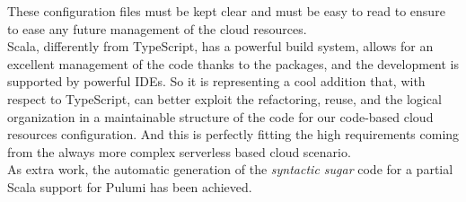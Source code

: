 These configuration files must be kept clear and must be easy to read to ensure to ease any future management of the cloud resources.\\
Scala, differently from TypeScript, has a powerful build system, allows for an excellent management of the code thanks to the packages, and the development is supported by powerful IDEs.
So it is representing a cool addition that, with respect to TypeScript, can better exploit the refactoring, reuse, and the logical organization in a maintainable structure of the code for our code-based cloud resources configuration.
And this is perfectly fitting the high requirements coming from the always more complex serverless based cloud scenario.\\
As extra work, the automatic generation of the \textit{syntactic sugar} code for a partial Scala support for Pulumi has been achieved.







